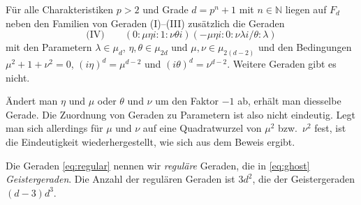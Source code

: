 \begin{theorem}[Geistergeraden]
Für alle Charakteristiken $p > 2$ und Grade $d = p^n + 1$ mit $n \in \mathbb N$ liegen auf $F_d$ neben den Familien von Geraden (I)--(III) zusätzlich die Geraden
\begin{equation} \label{eq:ghost}
\text{(IV)}\qquad (0:\mu\eta i:1:\nu\theta i)(-\mu\eta i:0:\nu\lambda i/\theta:\lambda)
\end{equation}
mit den Parametern $\lambda \in \mu_d$, $\eta, \theta \in \mu_{2d}$ und $\mu, \nu \in \mu_{2(d-2)}$ und den Bedingungen $\mu^2 + 1 + \nu^2 = 0$, $(i\eta)^d = \mu^{d-2}$ und $(i\theta)^d = \nu^{d-2}$. Weitere Geraden gibt es nicht.
\end{theorem}
\begin{remarks}
Ändert man $\eta$ und $\mu$ oder $\theta$ und $\nu$ um den Faktor $-1$ ab, erhält man diesselbe Gerade. Die Zuordnung von Geraden zu Parametern ist also nicht eindeutig. Legt man sich allerdings für $\mu$ und $\nu$ auf eine Quadratwurzel von $\mu^2$ bzw.~$\nu^2$ fest, ist die Eindeutigkeit wiederhergestellt, wie sich aus dem Beweis ergibt.
\end{remarks}
Die Geraden \eqref{eq:regular} nennen wir \emph{reguläre} Geraden, die in \eqref{eq:ghost} \emph{Geistergeraden}. Die Anzahl der regulären Geraden ist $3d^2$, die der Geistergeraden $(d-3)d^3$.
